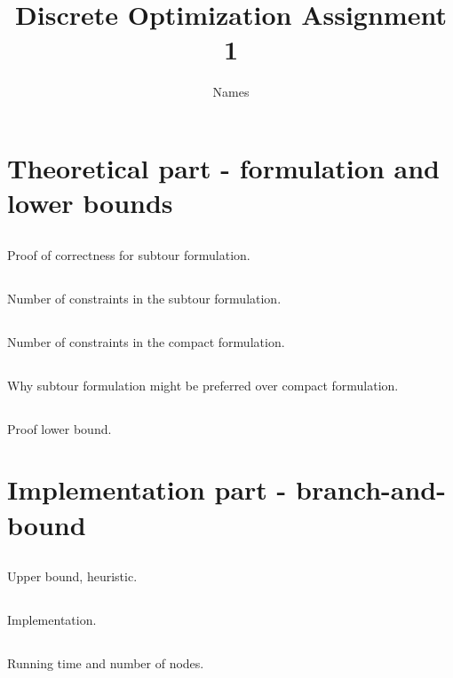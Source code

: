 \documentclass[11pt,a4paper,english]{article}
\begin{document}
\title{Discrete Optimization Assignment 1}
\author{Names}
\maketitle
\tableofcontents
\clearpage

\section{Theoretical part - formulation and lower bounds}

\subsection{}
Proof of correctness for subtour formulation.

\subsection{}
Number of constraints in the subtour formulation.

\subsection{}
Number of constraints in the compact formulation.

\subsection{}
Why subtour formulation might be preferred over compact formulation.

\subsection{}
Proof lower bound.

\clearpage

\section{Implementation part - branch-and-bound}

\subsection{}
Upper bound, heuristic.

\subsection{}
Implementation.

\subsection{}
Running time and number of nodes.
\end{document}
